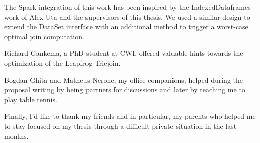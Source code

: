 \documentclass[11pt]{article}
\begin{document}
The Spark integration of this work has been inspired by the IndexedDataframes~\cite{uta2019low} work of Alex Uta and the supervisors
of this thesis.
We used a similar design to extend the DataSet interface with an additional method to trigger a worst-case optimal join computation.

Richard Gankema, a PhD student at CWI, offered valuable hints towards the optimization of the Leapfrog Triejoin.

Bogdan Ghita and Matheus Nerone, my office companions, helped during the proposal writing by being partners for discussions and later
by teaching me to play table tennis.

Finally, I'd like to thank my friends and in particular, my parents who helped me to stay focused on my thesis through a difficult private
situation in the last months.

\newpage
\tableofcontents
\newpage










\clearpage

\printbibliography
\clearpage


\end{document}
